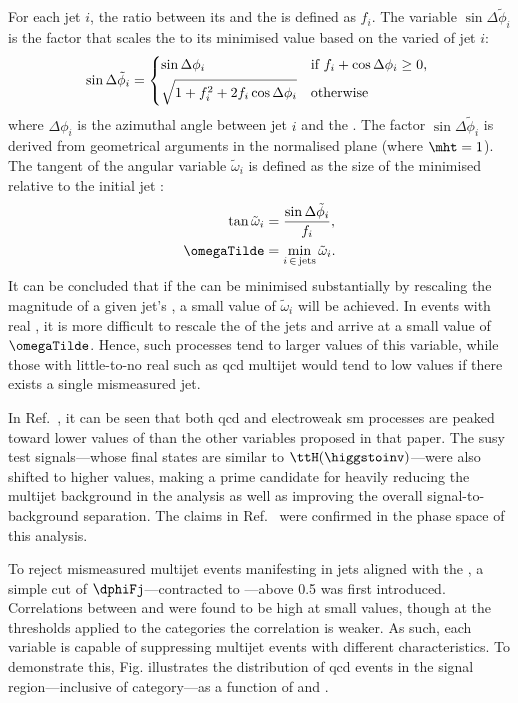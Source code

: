 For each jet $i$, the ratio between its \pt and the \mht is defined as $f_i$. The variable $\sin\Delta\tilde{\phi}_i$ is the factor that scales the \mht to its minimised value based on the varied \pt of jet $i$:
\begin{align}
\sin\Delta\tilde{\phi}_i = \begin{dcases*}
\sin\Delta\phi_i & if $f_i + \cos\Delta\phi_i \geq 0$, \\
\sqrt{1 + f_i^2 + 2 f_i \cos\Delta\phi_i} & otherwise\\
\end{dcases*}
\end{align}
where $\Delta\phi_i$ is the azimuthal angle between \gls{jet} $i$ and the \htvecmiss. The factor $\sin\Delta\tilde{\phi}_i$ is derived from geometrical arguments in the normalised \pt plane (where $\mht = \text{1}$). The tangent of the angular variable $\tilde{\omega}_i$ is defined as the size of the minimised \mht relative to the initial jet \pt:
\begin{equation}
    \begin{aligned}
\tan \tilde{\omega}_i &= \frac{ \sin\Delta\tilde{\phi}_i }{ f_i },\\
\omegaTilde &= \min_{i \, \in \, \mathrm{jets}} \tilde{\omega}_i.
    \end{aligned}
\end{equation}
It can be concluded that if the \mht can be minimised substantially by rescaling the magnitude of a given \gls{jet}'s \ptvec, a small value of $\tilde{\omega}_i$ will be achieved. In events with real \mht, it is more difficult to rescale the \pt of the \glspl{jet} and arrive at a small value of $\omegaTilde$. Hence, such processes tend to larger values of this variable, while those with little-to-no real \mht such as \acrshort{qcd} multijet would tend to low values if there exists a single mismeasured \gls{jet}.

In Ref.~, it can be seen that both \acrshort{qcd} and electroweak \acrlong{sm} processes are peaked toward lower values of \omegaTilde than the other variables proposed in that paper. The \acrlong{susy} test signals---whose final states are similar to $\ttH(\higgstoinv)$---were also shifted to higher values, making \omegaTilde a prime candidate for heavily reducing the multijet background in the analysis as well as improving the overall signal-to-background separation. The claims in Ref.~ were confirmed in the phase space of this analysis.

To reject mismeasured multijet events manifesting in \glspl{jet} aligned with the \ptvecmiss, a simple cut of $\dphiFj$---contracted to \mindphi---above 0.5 was first introduced. Correlations between \mindphi and \omegaTilde were found to be high at small values, though at the thresholds applied to the categories the correlation is weaker. As such, each variable is capable of suppressing multijet events with different characteristics. To demonstrate this, Fig. illustrates the distribution of \acrshort{qcd} events in the signal region---inclusive of category---as a function of \omegaTilde and \mindphi.

